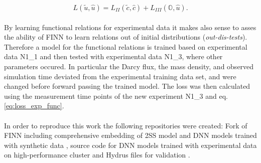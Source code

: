 \begin{equation}
    L(\tilde{u}, \hat{u}) = L_{II}(\tilde{c},\hat{c}) + L_{III}(\mathbb{O},\hat{u}).
    \label{eq:loss_exp_func}
\end{equation}
\\
By learning functional relations for experimental data it makes also sense to asses the ability of FINN to learn relations out of initial distributions (\textit{out-dis-tests}). Therefore a model for the functional relations is trained based on experimental data N1\_1 and then tested with experimental data N1\_3, where other parameters occured. In particular the Darcy flux, the mass density, and observed simulation time deviated from the experimental training data set, and were changed before forward passing the trained model. The loss was then calculated using the measurement time points of the new experiment N1\_3 and eq. \ref{eq:loss_exp_func}.\\ 
\\
In order to reproduce this work the following repositories were created: Fork of FINN including comprehensive embedding of 2SS model and DNN models trained with synthetic data \cite{FINN_fork}, source code for DNN models trained with experimental data on high-performance cluster \cite{FINN_emma} and Hydrus files for validation \cite{Hydrus_BA}.
